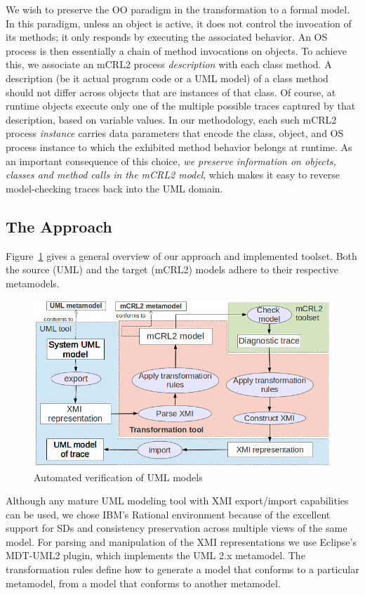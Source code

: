 \documentclass[letter]{llncs}
\newcommand{\figshrink}{\vspace{-.6cm}}
\newcommand{\figshrinkend}{}
\newcommand{\subsecshrink}{\vspace{-.5cm}}
\newcommand{\subsecshrinkbegin}{\vspace{-.2cm}}
\begin{document}
We wish to preserve the OO paradigm in the transformation to a formal model. In this paradigm, unless an object is active, 
it does not control the invocation of its methods; it only responds by executing the associated behavior. 
An OS process is then essentially a chain of method invocations on objects. To achieve this, we associate an mCRL2 process \emph{description} with each class method.
A description (be it actual program code or a UML model) of a class method should not differ across objects that are instances of that class. 
Of course, at runtime objects execute only one of the multiple possible traces captured by that description, based on variable values. 
In our methodology, each such mCRL2 process \emph{instance} carries data parameters that encode the class, object, and OS process instance to which the
exhibited method behavior belongs at runtime. As an important consequence of this choice, \emph{we preserve information on objects, classes and method calls in the mCRL2 model}, which
makes it easy to reverse model-checking traces back into the UML domain.
\subsecshrink
\subsection{The Approach}
\subsecshrinkbegin
Figure~\ref{fig:approach} gives a general overview of our approach and implemented toolset. 
Both the source (UML) and the target (mCRL2) models adhere to their respective metamodels.
\begin{figure}[!t]
\centering
\figshrink
\includegraphics[width=0.8\linewidth,keepaspectratio=true]{./Approach.png}
\caption{Automated verification of UML models}
\label{fig:approach}
\figshrinkend
\end{figure}
Although any mature UML modeling tool with XMI export/import capabilities can be used, we chose IBM's Rational environment
because of the excellent support for SDs and consistency preservation across multiple views of the same model.
For parsing and manipulation of the XMI representations we use Eclipse's MDT-UML2 plugin, which implements the UML 2.x metamodel.
The transformation rules define how to generate a model that conforms to a
particular metamodel, from a model that conforms to another metamodel.
\end{document}
